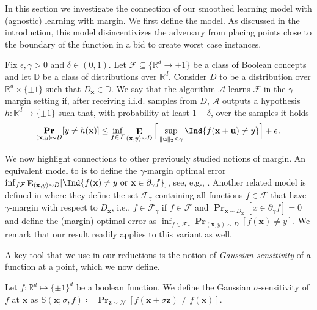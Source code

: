 \documentclass{theoretics}
\newcommand{\eqdef}{\coloneqq}
\renewcommand\vec[1]{\mathbf{#1}}
\DeclareMathOperator*{\pr}{\mathbf{Pr}}
\DeclareMathOperator*{\E}{\mathbf{E}}
\newcommand{\normal}{\mathcal{N}}
\newcommand{\R}{\mathbb{R}}
\newcommand{\N}{\mathbb{N}}
\newcommand{\eps}{\epsilon}
\newcommand{\1}{\Ind}
\newcommand{\x}{\vec x}
\newcommand{\z}{\vec z}
\newcommand{\F}{\mathcal{F}}
\newcommand{\Dmarginal}{D_{\x}}
\newcommand{\Djoint}{D}
\newcommand{\Alg}{\mathcal{A}}
\newcommand{\Dclass}{\mathbb{D}}
\begin{document}
In this section we investigate the connection of our smoothed learning model with (agnostic) learning with margin. We first define the model. As discussed in the introduction, this model disincentivizes the adversary from placing points close to the boundary of the function in a bid to create worst case instances.
\begin{definition}\label{definition:agnostic-margin} 
Fix $\eps, \gamma >0$ and $\delta\in (0,1)$.
Let $\F\subseteq\{\R^d\to {\pm 1}\}$ be a class of Boolean concepts and let $\Dclass$ be a class of distributions over $\R^d$.
    Consider $\Djoint$ to be a distribution over $\R^d\times \{\pm 1\}$ such that $\Dmarginal\in \Dclass$.
    We say that the algorithm $\Alg$ learns $\F$ in the $\gamma$-margin setting if, after receiving i.i.d. samples from $\Djoint$, 
    $\Alg$ outputs a hypothesis $h:\R^d \to \{\pm 1\}$ such that,
    with probability at least $1-\delta$, over the samples it holds
    \begin{equation}
        \pr_{(\x, y) \sim \Djoint}[y\neq h(\x)] \le 
        \inf_{f \in \mathcal F}
         \E_{(\x, y) \sim \Djoint}\Big[ \sup_{\|\vec u\|_2 \leq \gamma} \1\{f(\x + \vec u) \neq y \} \Big] + \eps \,.
    \end{equation}
\end{definition}
\begin{remark}
    We now highlight connections to other previously studied notions of margin.
    An equivalent model to  is to define the $\gamma$-margin optimal error $\inf_{f \mathcal F} \E_{(\x,y)\sim D}[\1\{f(\x)\neq y\text{ or } \x\in \partial_{\gamma}f\}]$, see, e.g., \cite{diakonikolas19marginopt}.
    Another related model is defined in \cite{klivans-servedio-margin} where they define the set $\mathcal F_\gamma$ containing all functions $f\in \F$ that have $\gamma$-margin with respect to $D_\x$, i.e., $f \in \mathcal{F}_\gamma$ if $f \in \mathcal F$ and $\pr_{\x\sim D_{\x}}[x\in \partial_{\gamma}f]=0$ and define the (margin) optimal error as
    $\inf_{f \in \mathcal F_\gamma} \pr_{(\x, y) \sim D}[f(\x) \neq y]$.
    We remark that our result readily applies to this variant as well. 
\end{remark}

A key tool that we use in our reductions is the notion of \textit{Gaussian sensitivity} of a function at a point, which we now define. 
\begin{definition}[Gaussian Sensitivity at $\x$]
Let $f:\R^d \mapsto \{\pm 1\}^d$ be a boolean function.  We define the Gaussian $\sigma$-sensitivity of $f$ at $\x$ as $\mathbb{S}(\x;\sigma, f) \eqdef \pr_{\vec z \sim \normal}[f(\x + \sigma \z) \neq f(\x)]$.
\end{definition}
\end{document}

